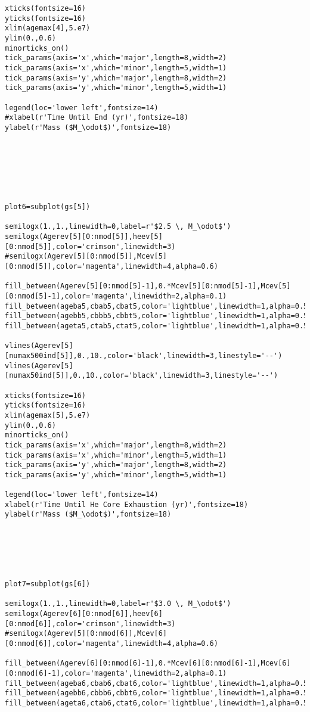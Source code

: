 \begin{verbatim}
xticks(fontsize=16)
yticks(fontsize=16)
xlim(agemax[4],5.e7)
ylim(0.,0.6)
minorticks_on()
tick_params(axis='x',which='major',length=8,width=2)
tick_params(axis='x',which='minor',length=5,width=1)
tick_params(axis='y',which='major',length=8,width=2)
tick_params(axis='y',which='minor',length=5,width=1)

legend(loc='lower left',fontsize=14)
#xlabel(r'Time Until End (yr)',fontsize=18)
ylabel(r'Mass ($M_\odot$)',fontsize=18)







plot6=subplot(gs[5])

semilogx(1.,1.,linewidth=0,label=r'$2.5 \, M_\odot$')
semilogx(Agerev[5][0:nmod[5]],heev[5][0:nmod[5]],color='crimson',linewidth=3)
#semilogx(Agerev[5][0:nmod[5]],Mcev[5][0:nmod[5]],color='magenta',linewidth=4,alpha=0.6)

fill_between(Agerev[5][0:nmod[5]-1],0.*Mcev[5][0:nmod[5]-1],Mcev[5][0:nmod[5]-1],color='magenta',linewidth=2,alpha=0.1)
fill_between(ageba5,cbab5,cbat5,color='lightblue',linewidth=1,alpha=0.5)
fill_between(agebb5,cbbb5,cbbt5,color='lightblue',linewidth=1,alpha=0.5)
fill_between(ageta5,ctab5,ctat5,color='lightblue',linewidth=1,alpha=0.5)

vlines(Agerev[5][numax500ind[5]],0.,10.,color='black',linewidth=3,linestyle='--')
vlines(Agerev[5][numax50ind[5]],0.,10.,color='black',linewidth=3,linestyle='--')

xticks(fontsize=16)
yticks(fontsize=16)
xlim(agemax[5],5.e7)
ylim(0.,0.6)
minorticks_on()
tick_params(axis='x',which='major',length=8,width=2)
tick_params(axis='x',which='minor',length=5,width=1)
tick_params(axis='y',which='major',length=8,width=2)
tick_params(axis='y',which='minor',length=5,width=1)

legend(loc='lower left',fontsize=14)
xlabel(r'Time Until He Core Exhaustion (yr)',fontsize=18)
ylabel(r'Mass ($M_\odot$)',fontsize=18)






plot7=subplot(gs[6])

semilogx(1.,1.,linewidth=0,label=r'$3.0 \, M_\odot$')
semilogx(Agerev[6][0:nmod[6]],heev[6][0:nmod[6]],color='crimson',linewidth=3)
#semilogx(Agerev[5][0:nmod[6]],Mcev[6][0:nmod[6]],color='magenta',linewidth=4,alpha=0.6)

fill_between(Agerev[6][0:nmod[6]-1],0.*Mcev[6][0:nmod[6]-1],Mcev[6][0:nmod[6]-1],color='magenta',linewidth=2,alpha=0.1)
fill_between(ageba6,cbab6,cbat6,color='lightblue',linewidth=1,alpha=0.5)
fill_between(agebb6,cbbb6,cbbt6,color='lightblue',linewidth=1,alpha=0.5)
fill_between(ageta6,ctab6,ctat6,color='lightblue',linewidth=1,alpha=0.5)


\end{verbatim}
